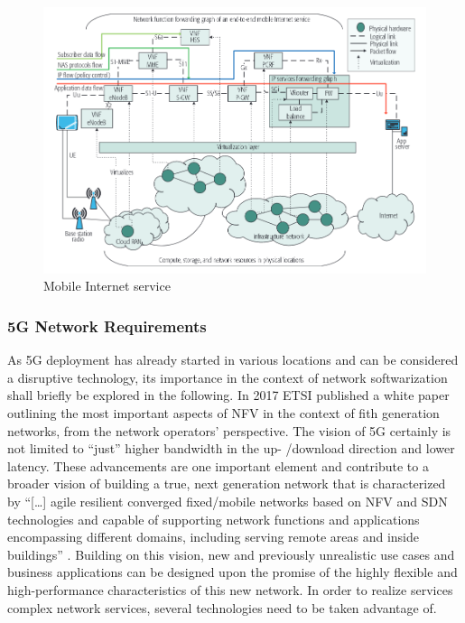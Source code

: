 \begin{figure}[h]
	\includegraphics[width=1\linewidth]{images/mobileInternetServices.png}
	\caption{Mobile Internet service \cite{abdelwahab2016network}}
	\label{img:mobile}
\end{figure}



\subsubsection{5G Network Requirements}
As 5G deployment has already started in various locations and can be considered a disruptive technology, its importance in the context of network softwarization shall briefly be explored in the following. In 2017 ETSI published a white paper outlining the most important aspects of NFV in the context of fith generation networks, from the network operators' perspective. The vision of 5G certainly is not limited to ``just'' higher bandwidth in the up- /download  direction and lower latency. These advancements are one important element and contribute to a broader vision of  building a true, next generation network that is characterized by ``[\dots] agile resilient converged fixed/mobile networks based on NFV and SDN technologies and capable of supporting network functions and applications encompassing different domains, including serving remote areas and inside buildings'' \cite{nfv5g}. Building on this vision, new and previously unrealistic use cases and business applications can be designed upon the promise of the highly flexible and high-performance characteristics of this new network. In order to realize services complex network services, several technologies need to be taken advantage of. 


